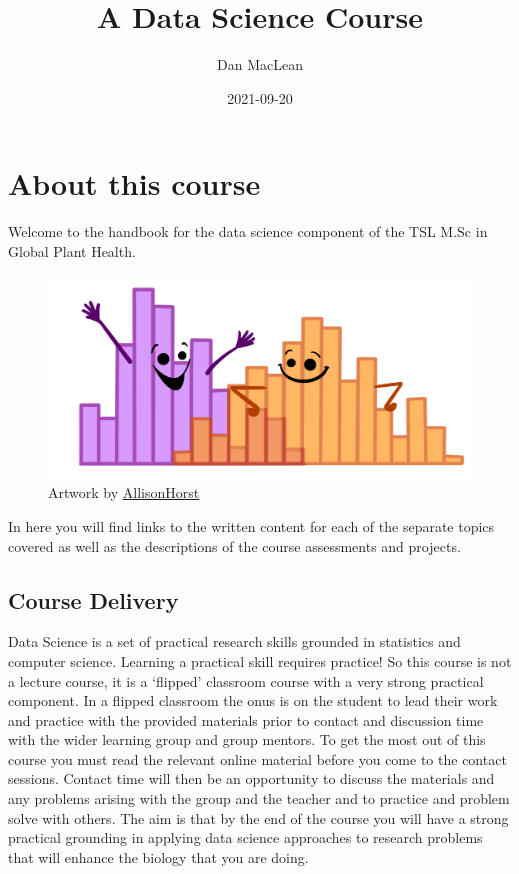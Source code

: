 \documentclass[
]{book}
\title{A Data Science Course}
\author{Dan MacLean}
\date{2021-09-20}
\begin{document}
\maketitle

{
\setcounter{tocdepth}{1}
\tableofcontents
}
\hypertarget{about-this-course}{%
\chapter{About this course}\label{about-this-course}}

Welcome to the handbook for the data science component of the TSL M.Sc in Global Plant Health.

\begin{figure}
\centering
\includegraphics{ex_1.png}
\caption{\label{fig:unnamed-chunk-1}Artwork by \href{https://github.com/allisonhorst}{AllisonHorst}}
\end{figure}

In here you will find links to the written content for each of the separate topics covered as well as the descriptions of the course assessments and projects.

\hypertarget{course-delivery}{%
\section{Course Delivery}\label{course-delivery}}

Data Science is a set of practical research skills grounded in statistics and computer science. Learning a practical skill requires practice! So this course is not a lecture course, it is a `flipped' classroom course with a very strong practical component. In a flipped classroom the onus is on the student to lead their work and practice with the provided materials prior to contact and discussion time with the wider learning group and group mentors. To get the most out of this course you must read the relevant online material before you come to the contact sessions. Contact time will then be an opportunity to discuss the materials and any problems arising with the group and the teacher and to practice and problem solve with others. The aim is that by the end of the course you will have a strong practical grounding in applying data science approaches to research problems that will enhance the biology that you are doing.
\end{document}
